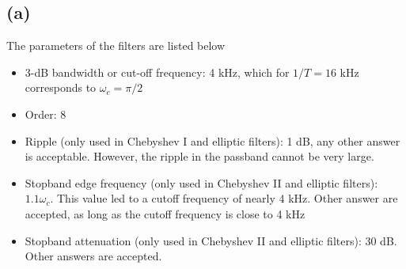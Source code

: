 \documentclass{article}
\begin{document}
\subsection{(a)}

The parameters of the filters are listed below
\begin{itemize}
	\item 3-dB bandwidth or cut-off frequency: 4 kHz, which for $1/T = 16$ kHz corresponds to $\omega_c = \pi/2$ 
	\item Order: 8
	\item Ripple (only used in Chebyshev I and elliptic filters): 1 dB, any other answer is acceptable. However, the ripple in the passband cannot be very large.
	\item Stopband edge frequency (only used in Chebyshev II and elliptic filters): $1.1\omega_c$. This value led to a cutoff frequency of nearly 4 kHz. Other answer are accepted, as long as the cutoff frequency is close to 4 kHz
	\item Stopband attenuation (only used in Chebyshev II and elliptic filters): 30 dB. Other answers are accepted.
\end{itemize}
\end{document}
